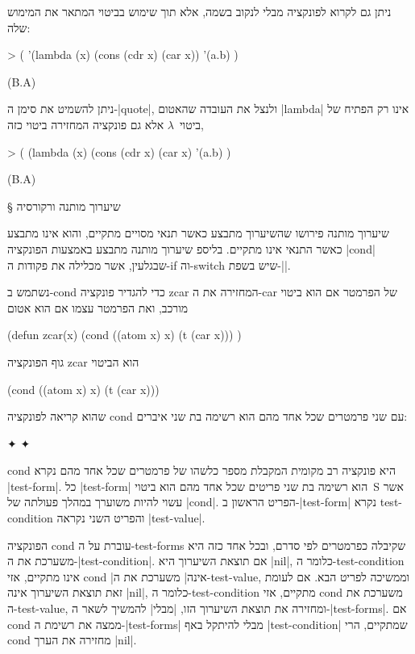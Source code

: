 \documentclass[a4paper,12pt,reqno]{article}
\begin{document}
ניתן גם לקרוא לפונקציה מבלי לנקוב בשמה, אלא תוך שימוש בביטוי המתאר את המימוש
שלה:
\begin{LISP}
> (
    '(lambda (x)
      (cons (cdr x) (car x))
    '(a.b)
)

(B.A)
\end{LISP}
ניתן להשמיט את סימן ה-\E|quote|, ולנצל את העובדה שהאטום \T|lambda| אינו רק
הפתיח של ביטוי~$λ$ אלא גם פונקציה המחזירה ביטוי כזה,
\begin{LISP}
> (
    (lambda (x) (cons (cdr x) (car x)
    '(a.b)
)

(B.A)
\end{LISP}

§ שיערוך מותנה ורקורסיה

שיערוך מותנה פירושו שהשיערוך מתבצע כאשר תנאי מסויים מתקיים, והוא אינו מתבצע
כאשר התנאי אינו מתקיים. בליספ שיערוך מותנה מתבצע באמצעות הפונקציה \E|cond|
שבגלעין, אשר מכלילה את פקודות ה-if וה-switch שיש בשפת-\E|\CPL|.

נשתמש ב-cond כדי להגדיר פונקציה zcar המחזירה את ה-car של הפרמטר אם
הוא ביטוי מורכב, ואת הפרמטר עצמו אם הוא אטום
\begin{LISP}
(defun zcar(x)
  (cond ((atom x) x) (t (car x)))
)
\end{LISP}
גוף הפונקציה zcar הוא הביטוי
\begin{LISP}
  (cond ((atom x) x) (t (car x)))
\end{LISP}
שהוא קריאה לפונקציה cond עם שני פרמטרים שכל אחד מהם הוא רשימה בת שני איברים:
\begin{LTR}
  \begin{itemize}
    ✦ 
    ✦ 
  \end{itemize}
\end{LTR}
cond היא פונקציה רב מקומית המקבלת מספר כלשהו של פרמטרים שכל אחד מהם נקרא
\E|test-form|. כל \E|test-form| הוא רשימה בת שני פריטים שכל אחד מהם הוא ביטוי~S
אשר עשוי להיות משוערך במהלך פעולתה של \E|cond|. הפריט הראשון ב-\E|test-form|
נקרא test-condition והפריט השני נקראה \E|test-value|.

הפונקציה cond עוברת על ה-test-forms שקיבלה כפרמטרים לפי סדרם, ובכל אחד כזה היא
משערכת את ה-\E|test-condition|. אם תוצאת השיערוך היא \E|nil|, כלומר
ה-test-condition אינו מתקיים, אזי cond \ע|אינה| משערכת את ה-test-value, וממשיכה
לפריט הבא. אם לעומת זאת תוצאת השיערוך אינה \E|nil|, כלומר ה-test-condition
מתקיים, אזי cond משערכת את ה-test-value, ומחזירה את תוצאת השיערוך הזו, \ע|מבלי|
להמשיך לשאר ה-\E|test-forms|. אם cond ממצה את רשימת ה-\E|test-forms| מבלי
להיתקל באף \E|test-condition| שמתקיים, הרי cond מחזירה את הערך \E|nil|.
\end{document}
